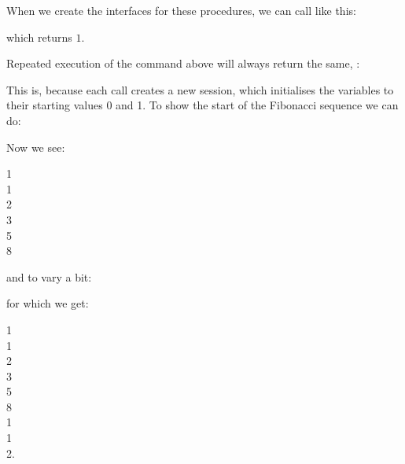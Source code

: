 When we create the interfaces for these procedures,
we can call  like this:


which returns $1$.

Repeated execution of the command above will always return the same, \eg:


This is, because each call creates a new session, which
initialises the variables to their starting values 0 and 1.
To show the start of the Fibonacci sequence we can do:


\begin{minipage}{\textwidth}
Now we see:

1\\
1\\
2\\
3\\
5\\
8
\end{minipage}

and to vary a bit:


\begin{minipage}{\textwidth}
for which we get:

1\\
1\\
2\\
3\\
5\\
8\\
1\\
1\\
2.
\end{minipage}

